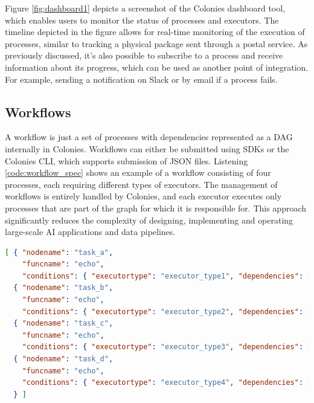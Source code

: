 \documentclass{article}
\begin{document}

Figure \ref{fig:dashboard1} depicts a screenshot of the Colonies dashboard tool, which enables users to monitor the status of processes and executors. The timeline depicted in the figure allows for real-time monitoring of the execution of processes, similar to tracking a physical package sent through a postal service. As previously discussed, it's also possible to subscribe to a process and receive information about its progress, which can be used as another point of integration. For example, sending a notification on Slack or by email if a process fails.

\subsection{Workflows}
A workflow is just a set of processes with dependencies represented as a DAG internally in Colonies. Workflows can either be submitted using SDKs or the Colonies CLI, which supports submission of JSON files. Listening \ref{code:workflow_spec} shows an example of a workflow consisting of four processes, each requiring different types of executors. The management of workflows is entirely handled by Colonies, and each executor executes only processes that are part of the graph for which it is responsible for. This approach significantly reduces the complexity of designing, implementing and operating large-scale AI applications and data pipelines. 

\begin{lstlisting}[basicstyle=\small, label=code:workflow_spec, language=json, basicstyle=\small, caption=Example of a workflow expressed in JSON.]
[ { "nodename": "task_a",
    "funcname": "echo",
    "conditions": { "executortype": "executor_type1", "dependencies": [] } },
  { "nodename": "task_b",
    "funcname": "echo",
    "conditions": { "executortype": "executor_type2", "dependencies": ["task_a"] } },
  { "nodename": "task_c",
    "funcname": "echo",
    "conditions": { "executortype": "executor_type3", "dependencies": ["task_a"] } },
  { "nodename": "task_d",
    "funcname": "echo",
    "conditions": { "executortype": "executor_type4", "dependencies": ["task_b", "task_c"] }
  } ]
\end{lstlisting}
\end{document}
